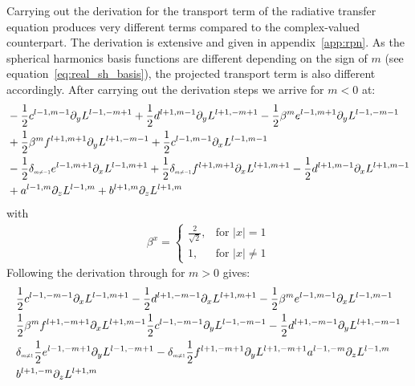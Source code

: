 Carrying out the derivation for the transport term of the radiative transfer equation produces very different terms compared to the complex-valued counterpart. The derivation is extensive and given in appendix~\ref{app:rpn}. As the spherical harmonics basis functions are different depending on the sign of $m$ (see equation~\ref{eq:real_sh_basis}), the projected transport term is also different accordingly. After carrying out the derivation steps we arrive for $m<0$ at:
\begin{align*}
&-\frac{1}{2}c^{{l-1,m-1}}
\partial_y
L^{l-1,-m+1}
+\frac{1}{2}d^{{l+1,m-1}}
\partial_y
L^{l+1,-m+1}
-\frac{1}{2}\beta^{m}e^{{l-1,m+1}}
\partial_y
L^{l-1,-m-1}
\\&
+\frac{1}{2}\beta^{m}f^{{l+1,m+1}}
\partial_y
L^{l+1,-m-1}
+\frac{1}{2}c^{{l-1,m-1}}
\partial_x
L^{l-1,m-1}
\\&
-\frac{1}{2}\delta_{\scaleto{m\neq -1}{4pt}}e^{{l-1,m+1}}
\partial_x
L^{l-1,m+1}
+\frac{1}{2}\delta_{\scaleto{m\neq -1}{4pt}}f^{{l+1,m+1}}
\partial_x
L^{l+1,m+1}
-\frac{1}{2}d^{{l+1,m-1}}
\partial_x
L^{l+1,m-1}
\\&
+a^{{l-1,m}}
\partial_z
L^{l-1,m}
+b^{{l+1,m}}
\partial_z
L^{l+1,m}
\end{align*}
with
\begin{align}
\label{eq:real_sh_basis}
\beta^{x}=
\left\{
\begin{array}{lr}
\frac{2}{\sqrt{2}}, & \text{for } \vert x\vert = 1\\
1, & \text{for } \vert x\vert \neq 1
\end{array}
\right.
\end{align}
Following the derivation through for $m>0$ gives:
\begin{align}
&
\frac{1}{2}c^{l-1,-m-1}\partial_x L^{l-1,m+1}
-\frac{1}{2}d^{l+1,-m-1}\partial_x L^{l+1,m+1}
-\frac{1}{2}\beta^{m}e^{l-1,m-1}\partial_x L^{l-1,m-1}
\nonumber
\\&
\frac{1}{2}\beta^{m}f^{l+1,-m+1}\partial_x L^{l+1,m-1}
\frac{1}{2}c^{l-1,-m-1}\partial_y L^{l-1,-m-1}
-\frac{1}{2}d^{l+1,-m-1}\partial_y L^{l+1,-m-1}
\nonumber
\\&
\delta_{\scaleto{m\neq 1}{4pt}}\frac{1}{2}e^{l-1,-m+1}\partial_y L^{l-1,-m+1}
-\delta_{\scaleto{m\neq 1}{4pt}}\frac{1}{2}f^{l+1,-m+1}\partial_y L^{l+1,-m+1}
a^{l-1,-m}\partial_z L^{l-1,m}
\nonumber
\\&
b^{l+1,-m}\partial_z L^{l+1,m}
\nonumber
\end{align}
